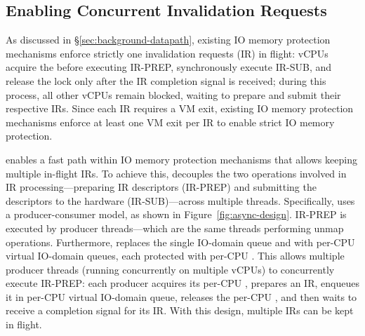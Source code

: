 
    



\subsection{Enabling Concurrent Invalidation Requests}
\label{ssec:enabling}
As discussed in \S\ref{sec:background-datapath}, 
    existing IO memory protection mechanisms 
    enforce strictly one invalidation requests (IR) in flight: 
    vCPUs acquire the  before executing IR-PREP, 
    synchronously execute IR-SUB, and release the lock only after the IR completion signal is received; 
    during this process, all other vCPUs remain blocked, waiting to prepare and submit their respective IRs. 
Since each IR requires a VM exit, existing IO memory protection mechanisms 
    enforce at least one VM exit per IR to enable strict IO memory protection.

{\name} enables a fast path within IO memory protection mechanisms that 
    allows keeping multiple in-flight IRs. 
To achieve this, {\name} decouples the two operations involved in IR processing---preparing 
    IR descriptors (IR-PREP) and submitting the descriptors to the hardware (IR-SUB)---across multiple threads. 
Specifically, {\name} uses a producer-consumer model, as shown in Figure~\ref{fig:async-design}. 
IR-PREP is executed by producer threads---which are the same threads performing unmap operations. 
Furthermore, {\name} replaces the single IO-domain queue and  
    with per-CPU virtual IO-domain queues, each protected with per-CPU . 
This allows multiple producer threads (running concurrently on multiple vCPUs) 
    to concurrently execute IR-PREP: 
    each producer acquires its per-CPU , 
    prepares an IR, enqueues it in per-CPU virtual IO-domain queue, releases the per-CPU , and then waits to receive a completion signal for its IR. 
With this design, multiple IRs can be kept in flight. %

